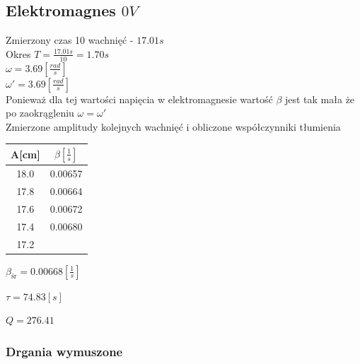 \documentclass[]{article}
\begin{document}
	\subsection{Elektromagnes $0V$}
	Zmierzony czas 10 wachnięć - $17.01s$\\
	Okres $T = \frac{17.01s}{10}=1.70s$\\
	$\omega = 3.69 \left[ \frac{rad}{s}\right]$\\
	$\omega' = 3.69 \left[ \frac{rad}{s}\right]$\\
	Ponieważ dla tej wartości napięcia w elektromagnesie wartość $\beta$ jest tak mała że po zaokrągleniu $\omega=\omega'$\\
	Zmierzone amplitudy kolejnych wachnięć i obliczone współczynniki tłumienia
	\begin{table}[h]
		\begin{tabular}{|c|c|}
			\hline 
			A[cm] & $\beta\left[ \frac{1}{s}\right] $ \\ 
			\hline 
			18.0 & 0.00657 \\ 
			\hline 
			17.8 & 0.00664 \\ 
			\hline 
			17.6 & 0.00672 \\ 
			\hline 
			17.4 & 0.00680 \\ 
			\hline 
			17.2 &  \\ 
			\hline 
		\end{tabular} 
	\end{table}

	$\beta_{\text{śr}} = 0.00668 \left[ \frac{1}{s}\right] $
	
	$\tau=74.83[s]$
	
	$Q = 276.41$
	
	\newpage
	\subsubsection{Drgania wymuszone}
	
\end{document}
